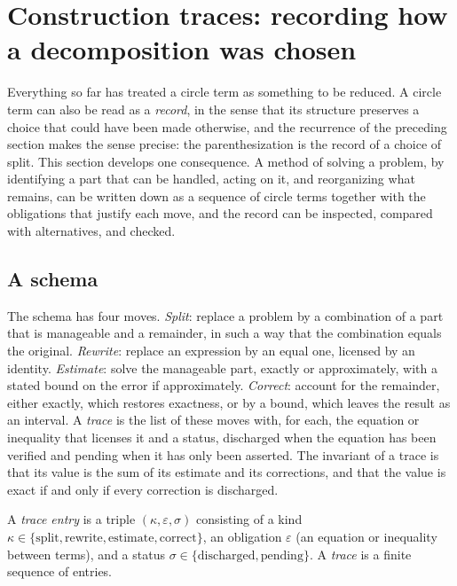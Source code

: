 \section{Construction traces: recording how a decomposition was chosen}\label{sec:traces}

Everything so far has treated a circle term as something to be reduced. A circle term can also be read as a \emph{record}, in the sense that its structure preserves a choice that could have been made otherwise, and the recurrence of the preceding section makes the sense precise: the parenthesization is the record of a choice of split. This section develops one consequence. A method of solving a problem, by identifying a part that can be handled, acting on it, and reorganizing what remains, can be written down as a sequence of circle terms together with the obligations that justify each move, and the record can be inspected, compared with alternatives, and checked.

\subsection{A schema}

The schema has four moves. \emph{Split}: replace a problem by a combination of a part that is manageable and a remainder, in such a way that the combination equals the original. \emph{Rewrite}: replace an expression by an equal one, licensed by an identity. \emph{Estimate}: solve the manageable part, exactly or approximately, with a stated bound on the error if approximately. \emph{Correct}: account for the remainder, either exactly, which restores exactness, or by a bound, which leaves the result as an interval. A \emph{trace} is the list of these moves with, for each, the equation or inequality that licenses it and a status, discharged when the equation has been verified and pending when it has only been asserted. The invariant of a trace is that its value is the sum of its estimate and its corrections, and that the value is exact if and only if every correction is discharged.

\begin{definition}
A \emph{trace entry} is a triple $(\kappa,\varepsilon,\sigma)$ consisting of a kind $\kappa\in\{\text{split},\text{rewrite},\text{estimate},\text{correct}\}$, an obligation $\varepsilon$ (an equation or inequality between terms), and a status $\sigma\in\{\text{discharged},\text{pending}\}$. A \emph{trace} is a finite sequence of entries.
\end{definition}

